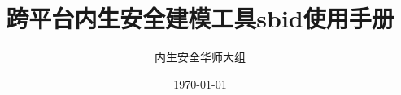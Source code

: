 \documentclass[UTF8,a4paper,12pt,oneside]{book}
\begin{document}
\title{\heiti 跨平台内生安全建模工具sbid使用手册}
\author{\kaishu 内生安全华师大组}
\date{\today}

\frontmatter
\maketitle
\tableofcontents

\mainmatter






\backmatter
\end{document}
